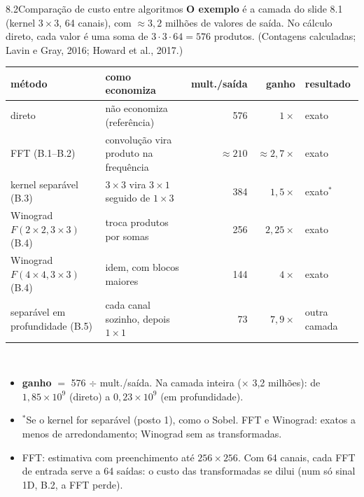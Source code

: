 \documentclass[aspectratio=169,11pt]{beamer}
\begin{document}
\begin{frame}{8.2\enspace Comparação de custo entre algoritmos}
  \small
  \textbf{O exemplo} é a camada do slide 8.1 (kernel $3\times3$, 64 canais), com $\approx3{,}2$ milhões de valores de saída.
  No cálculo direto, cada valor é uma soma de $3\cdot3\cdot64=576$ produtos. {\scriptsize\textcolor{cinza}{(Contagens calculadas; Lavin e Gray, 2016; Howard et al., 2017.)}}\\[0.5em]
  \centering
  \scriptsize
  \renewcommand{\arraystretch}{1.0}
  \begin{tabular}{@{}llrrl@{}}
    \toprule
    \textbf{método} & \textbf{como economiza} & \textbf{mult./saída} & \textbf{ganho} & \textbf{resultado} \\ \midrule
    direto & não economiza (referência) & 576 & $1\times$ & exato \\
    FFT (B.1--B.2) & convolução vira produto na frequência & $\approx210$ & $\approx2{,}7\times$ & exato \\
    kernel separável (B.3) & $3\times3$ vira $3\times1$ seguido de $1\times3$ & 384 & $1{,}5\times$ & exato$^{*}$ \\
    Winograd $F(2{\times}2,3{\times}3)$ (B.4) & troca produtos por somas & 256 & $2{,}25\times$ & exato \\
    Winograd $F(4{\times}4,3{\times}3)$ (B.4) & idem, com blocos maiores & 144 & $4\times$ & exato \\
    separável em profundidade (B.5) & cada canal sozinho, depois $1\times1$ & 73 & $7{,}9\times$ & \alert{outra camada} \\ \bottomrule
  \end{tabular}\\[0.2em]
  \raggedright
  \begin{itemize}
    \scriptsize
    \item \textbf{ganho} $=$ 576 $\div$ mult./saída. Na camada inteira ($\times$ 3,2 milhões): de $1{,}85\times10^{9}$ (direto) a $0{,}23\times10^{9}$ (em profundidade).
    \item $^{*}$Se o kernel for separável (posto 1), como o Sobel. FFT e Winograd: exatos a menos de arredondamento; Winograd sem as transformadas.
    \item FFT: estimativa com preenchimento até $256\times256$. Com 64 canais, cada FFT de entrada serve a 64 saídas: o custo das transformadas se dilui (num só sinal 1D, B.2, a FFT perde).
  \end{itemize}
\end{frame}
\end{document}
